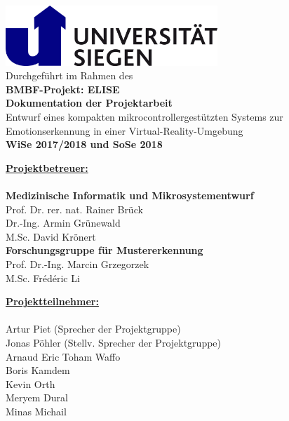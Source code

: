 
\begin{center}

\thispagestyle{empty}

	\includegraphics[width=8cm]{Images/uni-siegen-logo.png}
	\\
	\vspace*{1cm}
	\Large{Durchgeführt im Rahmen des}\\
	\Huge{\textbf{BMBF-Projekt: ELISE}}\\
	\vspace{1.0cm}
	\Huge{\textbf{Dokumentation der Projektarbeit}}\\
	\vspace{0.3cm}	
	\Large{Entwurf eines kompakten mikrocontrollergestützten Systems zur Emotionserkennung in einer Virtual-Reality-Umgebung}\\
\vspace{0.5cm}	
\Large{\textbf{WiSe 2017/2018 und SoSe 2018}}\\
\vspace{1cm}
\end{center}
	
\Large
\noindent
\underline{\textbf{Projektbetreuer:}}\\
\\
\noindent
\textbf{Medizinische Informatik und Mikrosystementwurf}\\
Prof. Dr. rer. nat. Rainer Brück\\
Dr.-Ing. Armin Grünewald\\
M.Sc. David Krönert\\

\noindent
\textbf{Forschungsgruppe für Mustererkennung}\\
Prof. Dr.-Ing. Marcin Grzegorzek\\
M.Sc. Frédéric Li\\
\vspace*{1.2cm}

\noindent
\underline{\textbf{Projektteilnehmer:}}\\
\\
\noindent
Artur Piet (Sprecher der Projektgruppe)\\
Jonas Pöhler (Stellv. Sprecher der Projektgruppe)\\
Arnaud Eric Toham Waffo\\
Boris Kamdem\\
Kevin Orth\\
Meryem Dural\\
Minas Michail\\